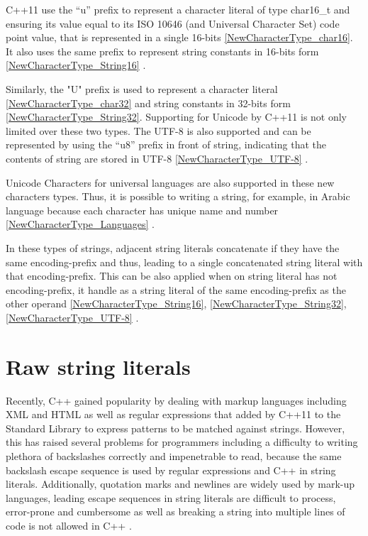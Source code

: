 \documentclass[11pt]{report}
\begin{document}
C++11 use the “u” prefix to represent a character literal of type char16\_t and ensuring its value equal to its ISO 10646 (and Universal Character Set) code point value, that is represented in a single 16-bits \ref{NewCharacterType_char16}. It also uses the same prefix to represent string constants in 16-bits form \ref{NewCharacterType_String16} \cite{Josuttis2012:CppStandardLibrary}.


Similarly, the "U" prefix is used to represent a character literal \ref{NewCharacterType_char32} and string constants in 32-bits form \ref{NewCharacterType_String32}.  Supporting for Unicode by C++11 is not only limited over these two types. The UTF-8 is also supported and can be represented by using the “u8” prefix in front of string, indicating that the contents of string are stored in UTF-8 \ref{NewCharacterType_UTF-8} \cite{Josuttis:2012:CppStandardLibrary}.


Unicode Characters for universal languages are also supported in these new characters types. Thus, it is possible to writing a string, for example, in Arabic language because each character has unique name and number \ref{NewCharacterType_Languages} \cite{Josuttis:2012:CppStandardLibrary}.


In these types of strings, adjacent string literals concatenate if they have the same encoding-prefix and thus, leading to a single concatenated string literal with that encoding-prefix. This can be also applied when on string literal has not encoding-prefix, it handle as a string literal of the same encoding-prefix as the other operand \ref{NewCharacterType_String16}, \ref{NewCharacterType_String32}, \ref{NewCharacterType_UTF-8} \cite{ ISO:2011:Cpplanguage}.


\section{Raw string literals}
\label{section: Raw string literals}
Recently, C++ gained popularity by dealing with markup languages including XML and HTML as well as regular expressions that added by C++11 to the Standard Library to express patterns to be matched against strings. However, this has raised several problems for programmers including a difficulty to writing plethora of backslashes correctly and impenetrable to read, because the same backslash escape sequence is used by regular expressions and C++ in string literals. Additionally, quotation marks and newlines are widely used by mark-up languages, leading escape sequences in string literals are difficult to process, error-prone and cumbersome as well as breaking a string into multiple lines of code is not allowed in C++ \cite{ISO:2011:Cpplanguage}.
\end{document}
